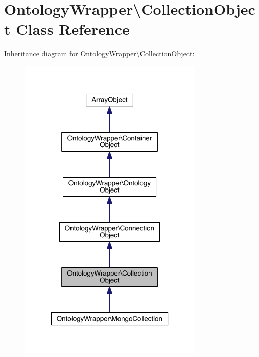 \hypertarget{class_ontology_wrapper_1_1_collection_object}{\section{Ontology\-Wrapper\textbackslash{}Collection\-Object Class Reference}
\label{class_ontology_wrapper_1_1_collection_object}
}


Inheritance diagram for Ontology\-Wrapper\textbackslash{}Collection\-Object\-:\nopagebreak
\begin{figure}[H]
\begin{center}
\leavevmode
\includegraphics[width=250pt]{class_ontology_wrapper_1_1_collection_object__inherit__graph}
\end{center}
\end{figure}


